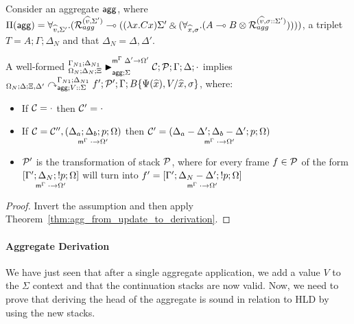 \begin{corollary}\label{thm:agg_match_to_derivation}
Consider an aggregate $\m{agg}$, where $\Pi(\m{agg}) = \forall_{\widehat{v}, \Sigma'}.
   (\defstwo{agg}{\widehat{v}}{\Sigma'} \lolli ((\lambda x. C x)\Sigma' \with (\forall_{\widehat{x}, \sigma}.
                                                (A \lolli B \otimes
                                                 \defstwo{agg}{\widehat{v}}{\sigma
                                                 ::\Sigma'}))))$,
a triplet $T = A; \Gamma; \Delta_{N}$ and that $\Delta_{N} = \Delta,
  \Delta'$.

A well-formed $\matstatea{\Delta_N}{\lstack{C}; \lstack{P}}{\Gamma}{\Delta}{\cdot}{\Delta' \rightarrow \Omega'}{\Sigma}$
implies
$\derstatea{\Delta}{\Xi, \Delta'}{\Gamma_{N1}}{\Delta_{N1}}{V :: \Sigma}{f';
   \lstack{P'}}{B\{\Psi(\widehat{x}), V / \widehat{x}, \sigma\}}$,
where:
   
\begin{itemize}[leftmargin=*]
   \item If $\lstack{C} = \cdot$ then $\lstack{C'} = \cdot$

   \item If $\lstack{C} = \lstack{C''},
   \lframe{\Delta_a}{\Delta_b}{p}{\Omega}{\cdot}{\Omega'}$
   then $\lstack{C'} = \lframe{\Delta_a - \Delta'}{\Delta_b -
      \Delta'}{p}{\Omega}{\cdot}{\Omega'}$

   \item $\lstack{P'}$ is the transformation of stack $\lstack{P}$, where for every frame $f \in
   \lstack{P}$ of the form $\pframe{\Gamma'}{\Delta_N}{\bang
      p}{\Omega}{\cdot}{\Omega'}$
   will turn into $f' = \pframe{\Gamma'}{\Delta_N-\Delta'}{\bang
      p}{\Omega}{\cdot}{\Omega'}$

\end{itemize}
\end{corollary}

\begin{proof}
Invert the assumption and then apply Theorem~\ref{thm:agg_from_update_to_derivation}.
\end{proof}


\paragraph{Aggregate Derivation}

We have just seen that after a single aggregate application, we add a value $V$
to the $\Sigma$ context and that the continuation stacks are now valid.
Now, we need to prove that deriving the head of the
aggregate is sound in relation to HLD by using the new stacks.

